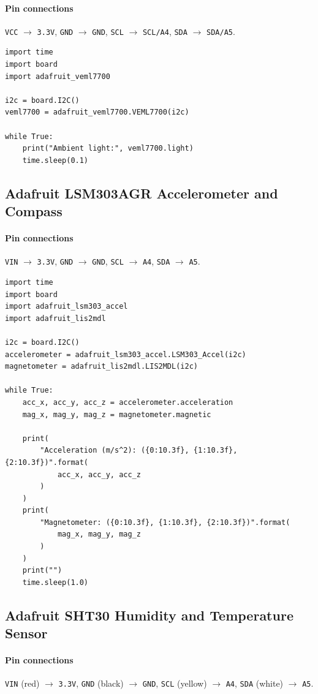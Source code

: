 \documentclass[11pt]{article}
\begin{document}
\paragraph{Pin connections} \texttt{VCC} $\rightarrow$ \texttt{3.3V}, \texttt{GND} $\rightarrow$ \texttt{GND}, \texttt{SCL} $\rightarrow$ \texttt{SCL/A4}, \texttt{SDA} $\rightarrow$ \texttt{SDA/A5}.

\begin{lstlisting}
import time
import board
import adafruit_veml7700

i2c = board.I2C()
veml7700 = adafruit_veml7700.VEML7700(i2c)

while True:
    print("Ambient light:", veml7700.light)
    time.sleep(0.1)
\end{lstlisting}

\subsection{Adafruit LSM303AGR Accelerometer and Compass}
\paragraph{Pin connections} \texttt{VIN} $\rightarrow$ \texttt{3.3V}, \texttt{GND} $\rightarrow$ \texttt{GND}, \texttt{SCL} $\rightarrow$ \texttt{A4}, \texttt{SDA} $\rightarrow$ \texttt{A5}.

\begin{lstlisting}
import time
import board
import adafruit_lsm303_accel
import adafruit_lis2mdl

i2c = board.I2C()
accelerometer = adafruit_lsm303_accel.LSM303_Accel(i2c)
magnetometer = adafruit_lis2mdl.LIS2MDL(i2c)

while True:
    acc_x, acc_y, acc_z = accelerometer.acceleration
    mag_x, mag_y, mag_z = magnetometer.magnetic

    print(
        "Acceleration (m/s^2): ({0:10.3f}, {1:10.3f}, {2:10.3f})".format(
            acc_x, acc_y, acc_z
        )
    )
    print(
        "Magnetometer: ({0:10.3f}, {1:10.3f}, {2:10.3f})".format(
            mag_x, mag_y, mag_z
        )
    )
    print("")
    time.sleep(1.0)
\end{lstlisting}

\subsection{Adafruit SHT30 Humidity and Temperature Sensor}
\paragraph{Pin connections} \texttt{VIN} (red) $\rightarrow$ \texttt{3.3V}, \texttt{GND} (black) $\rightarrow$ \texttt{GND}, \texttt{SCL} (yellow) $\rightarrow$ \texttt{A4}, \texttt{SDA} (white) $\rightarrow$ \texttt{A5}.
\end{document}
